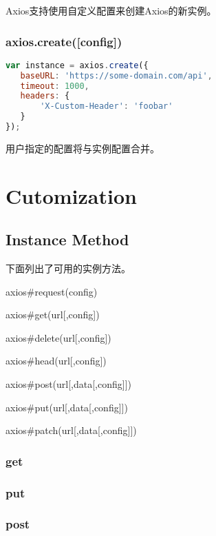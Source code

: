 Axios支持使用自定义配置来创建Axios的新实例。

\subsection{axios.create([config])}



\begin{lstlisting}[language=JavaScript]
var instance = axios.create({
   baseURL: 'https://some-domain.com/api',
   timeout: 1000,
   headers: {
       'X-Custom-Header': 'foobar'
   }
});
\end{lstlisting}

用户指定的配置将与实例配置合并。

\chapter{Cutomization}

\section{Instance Method}


下面列出了可用的实例方法。 

\begin{compactitem}
\item axios\#request(config)
\item axios\#get(url[,config])
\item axios\#delete(url[,config])
\item axios\#head(url[,config])
\item axios\#post(url[,data[,config]])
\item axios\#put(url[,data[,config]])
\item axios\#patch(url[,data[,config]])
\end{compactitem}






\subsection{get}


\subsection{put}




\subsection{post}





